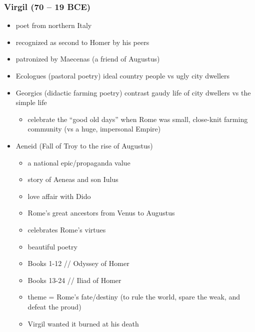 \documentclass[12pt, twoside]{article}
\begin{document}
\subsubsection{Virgil (70 – 19 BCE)}
\begin{itemize}
\item poet from northern Italy
\item recognized as second to Homer by his peers
\item patronized by Maecenas (a friend of Augustus)
\item Ecologues (pastoral poetry) ideal country people vs ugly city dwellers
\item Georgics (didactic farming poetry) contrast gaudy life of city dwellers vs the simple life
	\begin{itemize}
	\item celebrate the “good old days” when Rome was small, close-knit farming community (vs a huge, impersonal Empire)
	\end{itemize}
\item Aeneid (Fall of Troy to the rise of Augustus)
	\begin{itemize}
	\item a national epic/propaganda value
	\item story of Aeneas and son Iulus
	\item love affair with Dido
	\item Rome’s great ancestors from Venus to Augustus
	\item celebrates Rome’s virtues 
	\item beautiful poetry
	\item Books 1-12 // Odyssey of Homer
	\item Books 13-24 // Iliad of Homer
	\item theme = Rome’s fate/destiny (to rule the world, spare the weak, and defeat the proud)
	\item Virgil wanted it burned at his death
	\end{itemize}
\end{itemize}
\end{document}
